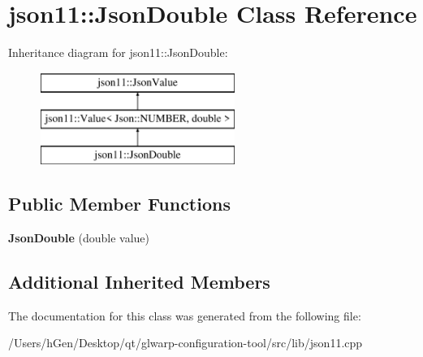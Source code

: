 \hypertarget{classjson11_1_1_json_double}{}\section{json11\+:\+:Json\+Double Class Reference}
\label{classjson11_1_1_json_double}
Inheritance diagram for json11\+:\+:Json\+Double\+:\begin{figure}[H]
\begin{center}
\leavevmode
\includegraphics[height=3.000000cm]{classjson11_1_1_json_double}
\end{center}
\end{figure}
\subsection*{Public Member Functions}
\begin{DoxyCompactItemize}
\item 
\mbox{\label{classjson11_1_1_json_double_a58b161847d227681e6d6e3f2a714af07}} 
{\bfseries Json\+Double} (double value)
\end{DoxyCompactItemize}
\subsection*{Additional Inherited Members}


The documentation for this class was generated from the following file\+:\begin{DoxyCompactItemize}
\item 
/\+Users/h\+Gen/\+Desktop/qt/glwarp-\/configuration-\/tool/src/lib/json11.\+cpp\end{DoxyCompactItemize}
